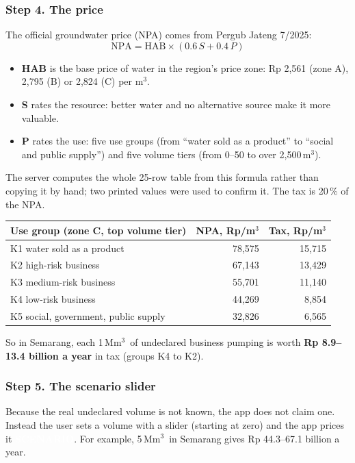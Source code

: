 \documentclass[11pt,a4paper]{article}
\newcommand{\pv}[2]{{\setlength{\fboxsep}{1.3pt}\colorbox{#1}{\textcolor{white}{\sffamily\bfseries\fontsize{6.3}{7}\selectfont #2}}}}
\newcommand{\Scn}{\pv{scen}{SCENARIO}}
\newcommand{\Mm}{\,Mm$^{3}$}
\newcommand{\mthree}{m$^{3}$}
\begin{document}
\subsubsection{Step 4. The price}
The official groundwater price (NPA) comes from Pergub Jateng 7/2025:
\[
\text{NPA} = \text{HAB}\times(0.6\,S + 0.4\,P)
\]
\begin{itemize}
\item \textbf{HAB} is the base price of water in the region's price zone: Rp 2,561 (zone A), 2,795 (B) or
  2,824 (C) per \mthree.
\item \textbf{S} rates the resource: better water and no alternative source make it more valuable.
\item \textbf{P} rates the use: five use groups (from ``water sold as a product'' to ``social and public
  supply'') and five volume tiers (from 0--50 to over 2,500\,\mthree).
\end{itemize}
The server computes the whole 25-row table from this formula rather than copying it by hand; two printed
values were used to confirm it. The tax is 20\,\% of the NPA.

\begin{center}
\small
\begin{tabular}{@{}lrr@{}}
\toprule
\textbf{Use group (zone C, top volume tier)} & \textbf{NPA, Rp/\mthree} & \textbf{Tax, Rp/\mthree}\\
\midrule
K1 water sold as a product & 78,575 & 15,715\\
K2 high-risk business & 67,143 & 13,429\\
K3 medium-risk business & 55,701 & 11,140\\
K4 low-risk business & 44,269 & 8,854\\
K5 social, government, public supply & 32,826 & 6,565\\
\bottomrule
\end{tabular}
\end{center}

So in Semarang, each 1\Mm\ of undeclared business pumping is worth \textbf{Rp 8.9--13.4 billion a year} in
tax (groups K4 to K2).

\subsubsection{Step 5. The scenario slider}
Because the real undeclared volume is not known, the app does not claim one. Instead the user sets a
volume with a slider (starting at zero) and the app prices it \Scn. For example, 5\Mm\ in Semarang gives
Rp 44.3--67.1 billion a year.
\end{document}
